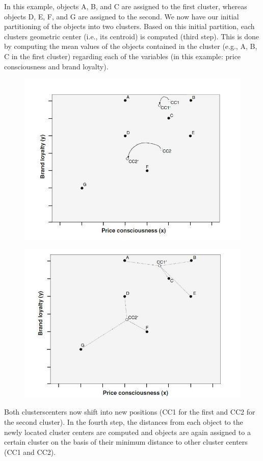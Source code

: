 \documentclass[a4paper,12pt]{article}
\begin{document}
In this example, objects A, B, and C are
assigned to the first cluster, whereas objects D, E, F, and G are assigned to the
second. We now have our initial partitioning of the objects into two clusters.
Based on this initial partition, each clusters geometric center (i.e., its centroid)
is computed (third step). This is done by computing the mean values of the objects
contained in the cluster (e.g., A, B, C in the first cluster) regarding each of the variables
(in this example: price consciousness and brand loyalty).
\begin{figure}[h!]
	\begin{center}
		\includegraphics[scale=0.4]{images/kmeans3.jpg}\\
	\end{center}
\end{figure}
\begin{figure}[h!]
	\begin{center}
		\includegraphics[scale=0.4]{images/kmeans4.jpg}\\
	\end{center}
\end{figure}
Both clusterscenters now shift into new positions (CC1 for the first and CC2 for the second cluster).
In the fourth step, the distances from each object to the newly located cluster
centers are computed and objects are again assigned to a certain cluster on the basis
of their minimum distance to other cluster centers (CC1 and CC2).
\end{document}
